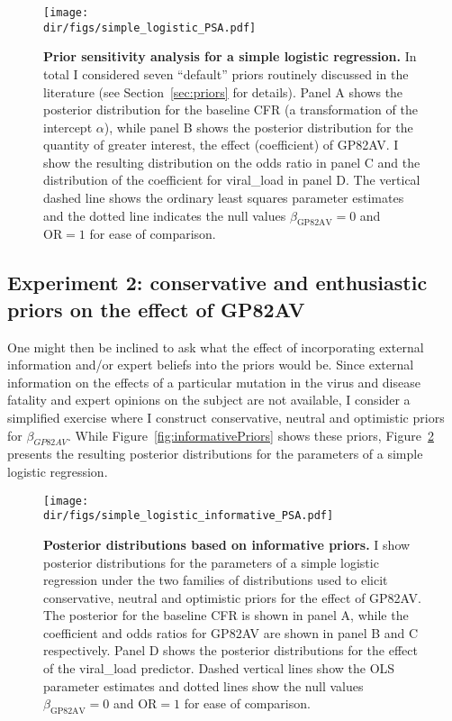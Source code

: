 \begin{figure}[!ht]
  \centering
  \texttt{[image: \\dir/figs/simple\_logistic\_PSA.pdf]}
\caption[Prior sensitivity analysis for a simple logistic regression.]{\textbf{Prior sensitivity analysis for a simple logistic regression.}
In total I considered seven ``default'' priors routinely discussed in the literature (see Section~\ref{sec:priors} for details).
Panel A shows the posterior distribution for the baseline CFR (a transformation of the intercept $\alpha$), while panel B shows the posterior distribution for the quantity of greater interest, the effect (coefficient) of GP82AV.
I show the resulting distribution on the odds ratio in panel C and the distribution of the coefficient for viral\_load in panel D.
The vertical dashed line shows the ordinary least squares parameter estimates and the dotted line indicates the null values $\beta_{\text{GP82AV}} = 0$ and $\text{OR} = 1$ for ease of comparison.
}
\label{fig:simpleLR}
\end{figure}

\subsection{Experiment 2: conservative and enthusiastic priors on the effect of GP82AV}
\label{sec:results-informative}

One might then be inclined to ask what the effect of incorporating external information and/or expert beliefs into the priors would be.
Since external information on the effects of a particular mutation in the virus and disease fatality and expert opinions on the subject are not available, I consider a simplified exercise where I construct conservative, neutral and optimistic priors for $\beta_{GP82AV}$.
While Figure~\ref{fig:informativePriors} shows these priors, Figure~\ref{fig:infomativePosteriors} presents the resulting posterior distributions for the parameters of a simple logistic regression.

\begin{figure}[!ht]
  \centering
  \texttt{[image: \\dir/figs/simple\_logistic\_informative\_PSA.pdf]}
\caption[Posterior distributions based on informative priors.]{\textbf{Posterior distributions based on informative priors.}
I show posterior distributions for the parameters of a simple logistic regression under the two families of distributions used to elicit conservative, neutral and optimistic priors for the effect of GP82AV.
The posterior for the baseline CFR is shown in panel A, while the coefficient and odds ratios for GP82AV are shown in panel B and C respectively.
Panel D shows the posterior distributions for the effect of the viral\_load predictor.
Dashed vertical lines show the OLS parameter estimates and dotted lines show the null values $\beta_{\text{GP82AV}} = 0$ and $\text{OR} = 1$ for ease of comparison.
}
\label{fig:infomativePosteriors}
\end{figure}

